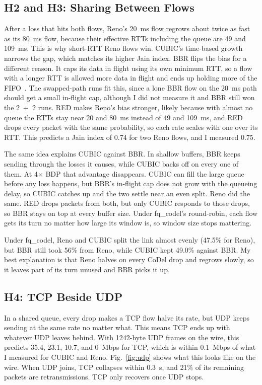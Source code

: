 \documentclass[conference,12pt,letterpaper]{IEEEtran}
\newcommand{\x}{\ensuremath{\times}}
\begin{document}
\subsection{H2 and H3: Sharing Between Flows}
After a loss that hits both flows, Reno's 20~ms flow regrows about twice as fast as its 80~ms flow, because their effective RTTs including the queue are 49 and 109~ms. This is why short-RTT Reno flows win. CUBIC's time-based growth narrows the gap, which matches its higher Jain index. BBR flips the bias for a different reason. It caps its data in flight using its own minimum RTT, so a flow with a longer RTT is allowed more data in flight and ends up holding more of the FIFO~\cite{hock,ware}. The swapped-path runs fit this, since a lone BBR flow on the 20~ms path should get a small in-flight cap, although I did not measure it and BBR still won the 2~+~2 runs. RED makes Reno's bias stronger, likely because with almost no queue the RTTs stay near 20 and 80~ms instead of 49 and 109~ms, and RED drops every packet with the same probability, so each rate scales with one over its RTT. This predicts a Jain index of 0.74 for two Reno flows, and I measured 0.75.

The same idea explains CUBIC against BBR. In shallow buffers, BBR keeps sending through the losses it causes, while CUBIC backs off on every one of them. At 4\x{} BDP that advantage disappears. CUBIC can fill the large queue before any loss happens, but BBR's in-flight cap does not grow with the queueing delay, so CUBIC catches up and the two settle near an even split. Reno did the same. RED drops packets from both, but only CUBIC responds to those drops, so BBR stays on top at every buffer size. Under fq\_codel's round-robin, each flow gets its turn no matter how large its window is, so window size stops mattering.

Under fq\_codel, Reno and CUBIC split the link almost evenly (47.5\% for Reno), but BBR still took 56\% from Reno, while CUBIC kept 49.0\% against BBR. My best explanation is that Reno halves on every CoDel drop and regrows slowly, so it leaves part of its turn unused and BBR picks it up.

\subsection{H4: TCP Beside UDP}
In a shared queue, every drop makes a TCP flow halve its rate, but UDP keeps sending at the same rate no matter what. This means TCP ends up with whatever UDP leaves behind. With 1242-byte UDP frames on the wire, this predicts 35.4, 23.1, 10.7, and 0~Mbps for TCP, which is within 0.1~Mbps of what I measured for CUBIC and Reno. Fig.~\ref{fig:udp} shows what this looks like on the wire. When UDP joins, TCP collapses within 0.3~s, and 21\% of its remaining packets are retransmissions. TCP only recovers once UDP stops.
\end{document}
